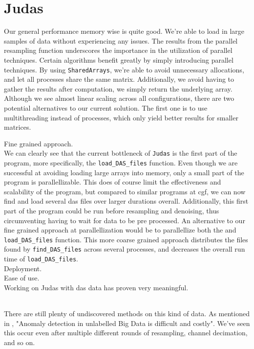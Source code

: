 \section{Judas}
\label{disc:judas}

Our general performance memory wise is quite good. We're able to load in large samples of data without experiencing any issues.
The results from the parallel resampling function underscores the importance in the utilization of parallel techniques. Certain algorithms benefit greatly by simply introducing parallel techniques. By using \texttt{SharedArrays}, we're able to avoid unnecessary allocations, and let all processes share the same matrix. Additionally, we avoid having to gather the results after computation, we simply return the underlying array. Although we see almost linear scaling across all configurations, there are two potential alternatives to our current solution. The first one is to use multithreading instead of processes, which only yield better results for smaller matrices.

Fine grained approach. \\

We can clearly see that the current bottleneck of \texttt{Judas} is the first part of the program, more specifically, the \texttt{load\_DAS\_files} function. Even though we are successful at avoiding loading large arrays into memory, only a small part of the program is parallellizable. This does of course limit the effectiveness and scalability of the program, but compared to similar programs at \acrshort{cgf}, we can now find and load several \acrshort{das} files over larger durations overall. Additionally, this first part of the program could be run before resampling and denoising, thus circumventing having to wait for data to be pre processed. An alternative to our fine grained approach at parallellization would be to parallellize both the and \texttt{load\_DAS\_files} function. This more coarse grained approach distributes the files found by \texttt{find\_DAS\_files} across several processes, and decreases the overall run time of \texttt{load\_DAS\_files}. \\

Deployment. \\ 

Ease of use. \\ 
Working on Judas with \acrshort{das} data has proven very meaningful. \\\

There are still plenty of undiscovered methods on this kind of data. As mentioned in \cite{MALEKI2021107443}, "Anomaly detection in unlabelled Big Data is difficult and costly". We've seen this occur even after multiple different rounds of resampling, channel decimation, and so on. 